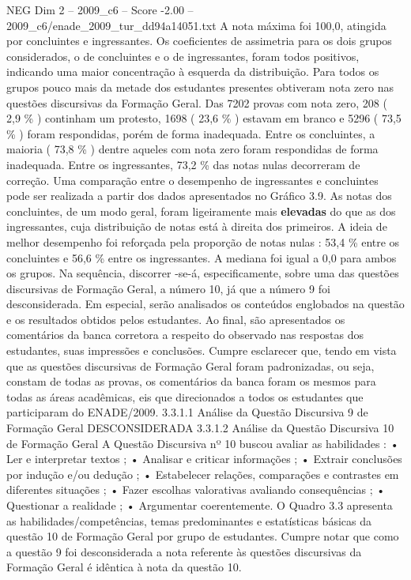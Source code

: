 \begin{textsample}{NEG Dim 2 – 2009\_c6 – Score -2.00 – 2009\_c6/enade\_2009\_tur\_dd94a14051.txt}
A nota máxima foi 100,0, atingida por concluintes e ingressantes.
Os coeficientes de assimetria para os dois grupos considerados, o de concluintes e o de ingressantes, foram todos positivos, indicando uma maior concentração à esquerda da distribuição.
Para todos os grupos pouco mais da metade dos estudantes presentes obtiveram nota zero nas questões discursivas da Formação Geral.
Das 7202 provas com nota zero, 208 ( 2,9 \% ) continham um protesto, 1698 ( 23,6 \% ) estavam em branco e 5296 ( 73,5 \% ) foram respondidas, porém de forma inadequada.
Entre os concluintes, a maioria ( 73,8 \% ) dentre aqueles com nota zero foram respondidas de forma inadequada.
Entre os ingressantes, 73,2 \% das notas nulas decorreram de correção.
Uma comparação entre o desempenho de ingressantes e concluintes pode ser realizada a partir dos dados apresentados no Gráfico 3.9.
As notas dos concluintes, de um modo geral, foram ligeiramente mais \textbf{elevadas} do que as dos ingressantes, cuja distribuição de notas está à direita dos primeiros.
A ideia de melhor desempenho foi reforçada pela proporção de notas nulas : 53,4 \% entre os concluintes e 56,6 \% entre os ingressantes.
A mediana foi igual a 0,0 para ambos os grupos.
Na sequência, discorrer -se-á, especificamente, sobre uma das questões discursivas de Formação Geral, a número 10, já que a número 9 foi desconsiderada.
Em especial, serão analisados os conteúdos englobados na questão e os resultados obtidos pelos estudantes.
Ao final, são apresentados os comentários da banca corretora a respeito do observado nas respostas dos estudantes, suas impressões e conclusões.
Cumpre esclarecer que, tendo em vista que as questões discursivas de Formação Geral foram padronizadas, ou seja, constam de todas as provas, os comentários da banca foram os mesmos para todas as áreas acadêmicas, eis que direcionados a todos os estudantes que participaram do ENADE/2009. 3.3.1.1 Análise da Questão Discursiva 9 de Formação Geral DESCONSIDERADA 3.3.1.2 Análise da Questão Discursiva 10 de Formação Geral A Questão Discursiva nº 10 buscou avaliar as habilidades : • Ler e interpretar textos ; • Analisar e criticar informações ; • Extrair conclusões por indução e/ou dedução ; • Estabelecer relações, comparações e contrastes em diferentes situações ; • Fazer escolhas valorativas avaliando consequências ; • Questionar a realidade ; • Argumentar coerentemente.
O Quadro 3.3 apresenta as habilidades/competências, temas predominantes e estatísticas básicas da questão 10 de Formação Geral por grupo de estudantes.
Cumpre notar que como a questão 9 foi desconsiderada a nota referente às questões discursivas da Formação Geral é idêntica à nota da questão 10.

\end{textsample}
